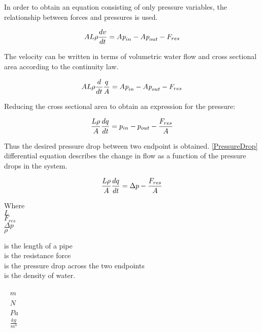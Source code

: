 In order to obtain an equation consisting of only pressure variables, the relationship between forces and pressures is used.


 \begin{equation}
    A L \rho \frac{dv}{dt} = A \textit{p}_{in} - A \textit{p}_{out} - F_{res} \\
\end{equation}

The velocity can be written in terms of volumetric water flow and cross sectional area according to the continuity law.

\begin{equation}
    A L \rho \frac{d}{dt} \frac{q}{A} = A \textit{p}_{in} - A \textit{p}_{out} - F_{res} \\
\end{equation}

Reducing the cross sectional area to obtain an expression for the pressure: 

\begin{equation}
    \frac{L \rho}{A} \frac{dq}{dt} =p_{in} - p_{out} - \frac{ F_{res}}{A} \\
\end{equation}

Thus the desired pressure drop between two endpoint is obtained. \eqref{PressureDrop} differential equation describes the change in flow as a function of the pressure drops in the system.

\begin{equation}
    \frac{L \rho}{A} \frac{dq}{dt} =\Delta p - \frac{ F_{res}}{A} \\
    \label{PressureDrop}
\end{equation}

 \begin{minipage}[t]{0.20\textwidth}
Where\\
\hspace*{8mm} $L$ \\
\hspace*{8mm} $F_{res}$ \\
\hspace*{8mm} $\Delta p$ \\
\hspace*{8mm} $\rho$ 
\end{minipage}
\begin{minipage}[t]{0.68\textwidth}
\vspace*{2mm}
is the length of a pipe\\
is the resistance force\\
is the pressure drop across the two endpoints\\
is the density of water.

\end{minipage}
\begin{minipage}[t]{0.10\textwidth}
\vspace*{2mm}
\textcolor{White}{te}$\unit{m}$\\
\textcolor{White}{te}$\unit{N}$\\
\textcolor{White}{te}$\unit{Pa}$\\
\textcolor{White}{te}$\unit{\frac{kg}{m^{3}}}$
\end{minipage}

